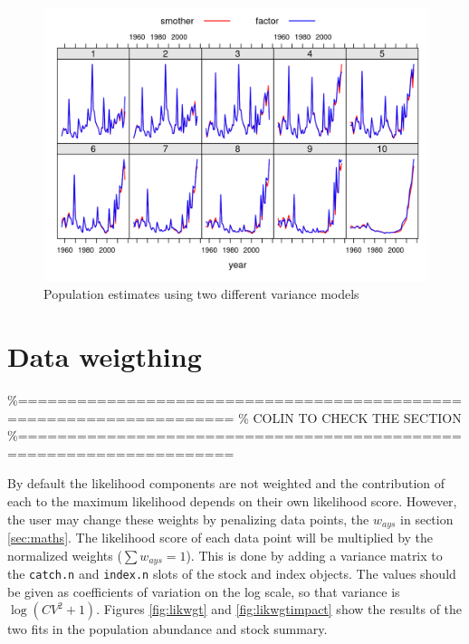 \documentclass[
]{book}
\begin{document}
\begin{figure}
\centering
\includegraphics{_bookdown_files/_main_files/figure-html/n1modimpact-1.png}
\caption{\label{fig:n1modimpact}Population estimates using two different variance models}
\end{figure}

\hypertarget{data-weigthing}{%
\section{Data weigthing}\label{data-weigthing}}

\%====================================================================
\% COLIN TO CHECK THE SECTION
\%====================================================================

By default the likelihood components are not weighted and the contribution of each to the maximum likelihood depends on their own likelihood score. However, the user may change these weights by penalizing data points, the \(w_{ays}\) in section \ref{sec:maths}. The likelihood score of each data point will be multiplied by the normalized weights (\(\sum w_{ays} = 1\)). This is done by adding a variance matrix to the \texttt{catch.n} and \texttt{index.n} slots of the stock and index objects. The values should be given as coefficients of variation on the log scale, so that variance is \(\log{({CV}^2 + 1)}\). Figures \ref{fig:likwgt} and \ref{fig:likwgtimpact} show the results of the two fits in the population abundance and stock summary.
\end{document}
